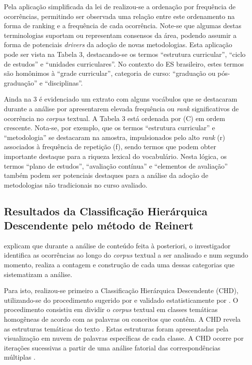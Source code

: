 \documentclass{textolivre-html}
\begin{document}
Pela aplicação simplificada da lei de \textcite{zipf1949} realizou-se a ordenação por frequência de ocorrências, permitindo ser observada uma relação entre este ordenamento na forma de ranking e a frequência de cada ocorrência. Note-se que algumas destas terminologias suportam ou representam consensos da área, podendo assumir a forma de potenciais \textit{drivers} da adoção de novas metodologias. Esta aplicação pode ser vista na Tabela 3, destacando-se os termos “estrutura curricular”, “ciclo de estudos” e “unidades curriculares”. No contexto do ES brasileiro, estes termos são homônimos à “grade curricular”, categoria de curso: “graduação ou pós-graduação” e “disciplinas”.

Ainda na  3 é evidenciado um extrato com alguns vocábulos que se destacaram durante a análise por apresentarem elevada frequência ou \textit{rank} significativos de ocorrência no \textit{corpus} textual. A Tabela 3 está ordenada por (C) em ordem crescente. Nota-se, por exemplo, que os termos “estrutura curricular” e “metodologia” se destacaram na amostra, impulsionados pelo alto \textit{rank} (r) associados à frequência de repetição (f), sendo termos que podem obter importante destaque para a riqueza lexical do vocabulário. Nesta lógica, os termos “plano de estudos”, “avaliação contínua” e “elementos de avaliação” também podem ser potenciais destaques para a análise da adoção de metodologias não tradicionais no curso avaliado.

\subsection{Resultados da Classificação Hierárquica Descendente pelo método de Reinert}\label{sec-classificacao}
\textcite{lebart1994}explicam que durante a análise de conteúdo feita à posteriori, o investigador identifica as ocorrências ao longo do \textit{corpus} textual a ser analisado e num segundo momento, realiza a contagem e construção de cada uma dessas categorias que sistematizam a análise.

Para isto, realizou-se primeiro a Classificação Hierárquica Descendente (CHD), utilizando-se do procedimento sugerido por \textcite{reinert1990} e validado estatisticamente por \textcite{benzecri2007}. O procedimento consistiu em dividir o \textit{corpus} textual em classes temáticas homogêneas de acordo com as palavras ou conceitos que contêm. A CHD revela as estruturas temáticas do texto \cite{reinert1990}. Estas estruturas foram apresentadas pela visualização em nuvem de palavras específicas de cada classe. A CHD ocorre por iterações sucessivas a partir de uma análise fatorial das correspondências múltiplas \cite{benzecri2007}.
\end{document}
